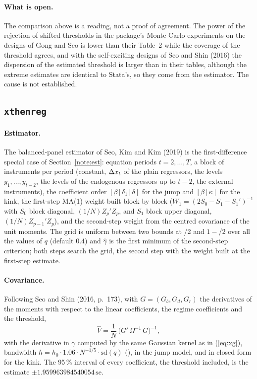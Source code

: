 \paragraph{What is open.} The comparison above is a reading, not a proof of agreement. The power of the
rejection of shifted thresholds in the package's Monte Carlo experiments on the designs of Gong and Seo is lower than
their Table~2 while the coverage of the threshold agrees, and with the self-exciting designs of Seo and Shin
(2016) the dispersion of the estimated threshold is larger than in their tables, although the extreme estimates are
identical to Stata's, so they come from the estimator. The cause is not established.

\subsection{\texttt{xthenreg}}\label{note:xthenreg}

\paragraph{Estimator.} The balanced-panel estimator of Seo, Kim and Kim (2019) is the first-difference special
case of Section~\ref{note:est}: equation periods $t=2,\dots,T$, a block of instruments per period
(constant, $\Delta x_t$ of the plain regressors, the levels $y_1,\dots,y_{t-2}$, the levels of the endogenous
regressors up to $t-2$, the external instruments), the coefficient order $[\beta\,|\,\delta_1\,|\,\delta]$ for the
jump and $[\beta\,|\,\kappa]$ for the kink, the first-step MA(1) weight built block by block
($W_1=(2S_0-S_1-S_1')^{-1}$ with $S_0$ block diagonal, $(1/N)Z_p'Z_p$, and $S_1$ block upper diagonal, $(1/N)Z_{p-1}'Z_p$), and the
second-step weight from the centred covariance of the unit moments. The grid is uniform between two
 bounds at /2 and $1-$/2 over all the values of $q$ (default
 $0.4$) and $\hat\gamma$ is the first minimum of the second-step criterion; both steps
search the grid, the second step with the weight built at the first-step estimate.

\paragraph{Covariance.} Following Seo and Shin (2016, p.~173), with $G=(G_b,G_d,G_r)$ the derivatives of the
moments with respect to the linear coefficients, the regime coefficients and the threshold,
\begin{equation}\label{eq:xhcov}
\widehat V=\frac1N\,\bigl(G'\,\Omega^{-1}\,G\bigr)^{-1},
\end{equation}
with the derivative in $\gamma$ computed by the same Gaussian kernel as in (\ref{eq:xg}), bandwidth
$h=h_0\cdot1.06\cdot N^{-1/5}\cdot\mathrm{sd}(q)$ (), in the jump model, and in closed form for the kink.
The 95\,\% interval of every coefficient, the threshold included, is the estimate $\pm1.959963984540054\,\mathrm{se}$.

